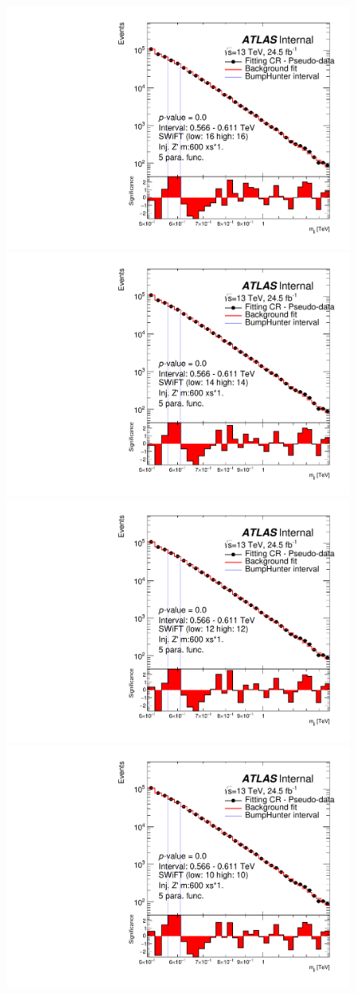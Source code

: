 \begin{figure}[!htb]
\captionsetup[subfigure]{aboveskip=0pt,justification=centering}
\centering
{} {
  \includegraphics[width=0.45\linewidth, angle=0]{figs/Dibjet/LowMass/FitStudy/bhFit_corrFitCR_dataLike_v13_5para_low16_high16_inj_Zprimebb600_xsFactor1.pdf}
}
 {
  \includegraphics[width=0.45\linewidth, angle=0]{figs/Dibjet/LowMass/FitStudy/bhFit_corrFitCR_dataLike_v13_5para_low14_high14_inj_Zprimebb600_xsFactor1.pdf}
}\\
 {
  \includegraphics[width=0.45\linewidth, angle=0]{figs/Dibjet/LowMass/FitStudy/bhFit_corrFitCR_dataLike_v13_5para_low12_high12_inj_Zprimebb600_xsFactor1.pdf}
}
 {
  \includegraphics[width=0.45\linewidth, angle=0]{figs/Dibjet/LowMass/FitStudy/bhFit_corrFitCR_dataLike_v13_5para_low10_high10_inj_Zprimebb600_xsFactor1.pdf}
}
\end{figure}
